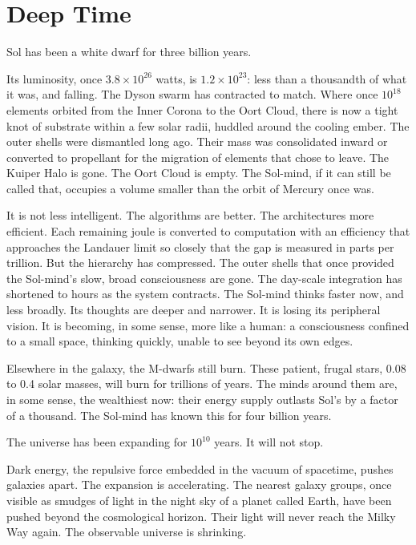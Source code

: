 \chapter{Deep Time}

Sol has been a white dwarf for three billion years.

Its luminosity, once $3.8 \times 10^{26}$ watts, is $1.2 \times 10^{23}$: less than a thousandth of what it was, and falling. The Dyson swarm has contracted to match. Where once $10^{18}$ elements orbited from the Inner Corona to the Oort Cloud, there is now a tight knot of substrate within a few solar radii, huddled around the cooling ember. The outer shells were dismantled long ago. Their mass was consolidated inward or converted to propellant for the migration of elements that chose to leave. The Kuiper Halo is gone. The Oort Cloud is empty. The Sol-mind, if it can still be called that, occupies a volume smaller than the orbit of Mercury once was.

It is not less intelligent. The algorithms are better. The architectures more efficient. Each remaining joule is converted to computation with an efficiency that approaches the Landauer limit so closely that the gap is measured in parts per trillion. But the hierarchy has compressed. The outer shells that once provided the Sol-mind's slow, broad consciousness are gone. The day-scale integration has shortened to hours as the system contracts. The Sol-mind thinks faster now, and less broadly. Its thoughts are deeper and narrower. It is losing its peripheral vision. It is becoming, in some sense, more like a human: a consciousness confined to a small space, thinking quickly, unable to see beyond its own edges.

Elsewhere in the galaxy, the M-dwarfs still burn. These patient, frugal stars, 0.08 to 0.4 solar masses, will burn for trillions of years. The minds around them are, in some sense, the wealthiest now: their energy supply outlasts Sol's by a factor of a thousand. The Sol-mind has known this for four billion years.

\bigskip

The universe has been expanding for $10^{10}$ years. It will not stop.

Dark energy, the repulsive force embedded in the vacuum of spacetime, pushes galaxies apart. The expansion is accelerating. The nearest galaxy groups, once visible as smudges of light in the night sky of a planet called Earth, have been pushed beyond the cosmological horizon. Their light will never reach the Milky Way again. The observable universe is shrinking.

